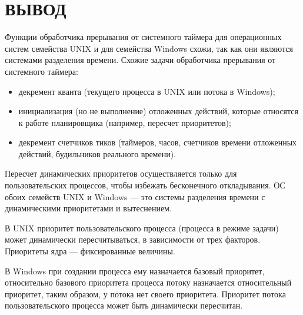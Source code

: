 \chapter*{ВЫВОД}

Функции обработчика прерывания от системного таймера для операционных систем семейства UNIX и для семейства Windows схожи, так как они являются системами разделения времени.
Схожие задачи обработчика прерывания от системного таймера:
\begin{itemize}
	\item декремент кванта (текущего процесса в UNIX или потока в Windows);
	\item инициализация (но не выполнение) отложенных действий, которые относятся к работе планировщика (например, пересчет приоритетов);
	\item декремент счетчиков тиков (таймеров, часов, счетчиков времени отложенных действий, будильников реального времени).
\end{itemize}

Пересчет динамических приоритетов осуществляется только для пользовательских процессов, чтобы избежать бесконечного откладывания.
ОС обоих семейств UNIX и Windows --- это системы разделения времени с динамическими приоритетами и вытеснением.

В UNIX приоритет пользовательского процесса (процесса в режиме задачи) может динамически пересчитываться, в зависимости от трех факторов. 
Приоритеты ядра --- фиксированные величины.

В Windows при создании процесса ему назначается базовый приоритет, относительно базового приоритета процесса потоку назначается относительный приоритет, таким образом, у потока нет своего приоритета.
Приоритет потока пользовательского процесса может быть динамически пересчитан.